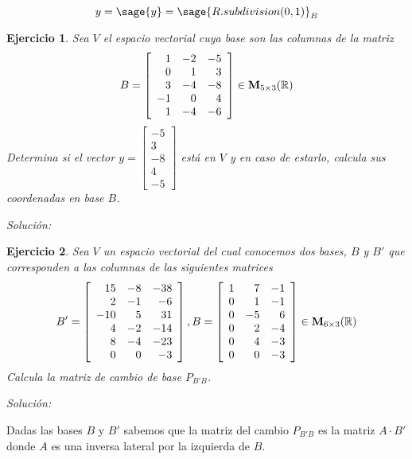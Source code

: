 \documentclass{amsart}
\newtheorem{ejer}{Ejercicio}
\def\r{\mathbb{R}}
\begin{document}
$$ y = \sage{y} = {\sage{R.subdivision(0,1)}}_B $$


\begin{ejer} Sea $V$ el espacio vectorial cuya base son las columnas de la matriz
\[ B = \left[\begin{array}{rrr}
1 & -2 & -5 \\
0 & 1 & 3 \\
3 & -4 & -8 \\
-1 & 0 & 4\\
1 & -4 & -6
\end{array}\right] \in {\bf M}_{5 \times 3}(\r )\]
Determina si el vector $y = {\left[\begin{array}{r}
-5 \\
3 \\
-8 \\
4 \\
-5
\end{array}\right]}$ est\'a en $V$ y en caso de estarlo, calcula sus coordenadas 
en base $B$.
\end{ejer}
{\it Soluci\'on:}



\begin{ejer} Sea $V$ un espacio vectorial del cual conocemos dos bases, $B$ y 
$B'$ que corresponden a las columnas de las siguientes matrices
\[ B' = \left[\begin{array}{rrr}
15 & -8 & -38 \\
2 & -1 & -6 \\
-10 & 5 & 31 \\
4 & -2 & -14 \\
8 & -4 & -23 \\
0 & 0 & -3
\end{array}\right] , B = \left[\begin{array}{rrr}
1 & 7 & -1 \\
0 & 1 & -1 \\
0 & -5 & 6 \\
0 & 2 & -4 \\
0 & 4 & -3 \\
0 & 0 & -3
\end{array}\right] \in {\bf  M}_{6 \times 3}({\mathbb R})\]
Calcula la matriz de cambio de base $P_{B'B}$.
\end{ejer}

{\it Soluci\'on:}

Dadas las bases $B$ y $B'$ sabemos que la matriz del cambio $P_{B'B}$ es la 
matriz $A\cdot B'$ donde $A$ es una inversa lateral por la izquierda de $B$.
\end{document}
